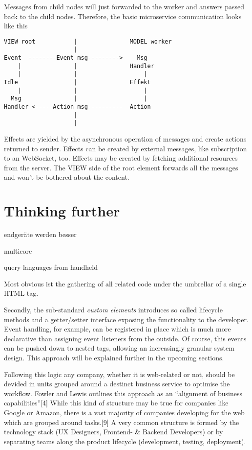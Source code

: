 \documentclass[]{article}
\begin{document}
Messages from child nodes will just forwarded to the worker and answers
passed back to the child nodes. Therefore, the basic microservice
communication looks like this

\begin{verbatim}
VIEW root           |               MODEL worker
                    |
Event  --------Event msg--------->    Msg
    |               |               Handler
    |               |                   |
Idle                |               Effekt
    |               |                   |
  Msg               |                   |
Handler <-----Action msg----------  Action                                      
                    |                   
                    |
\end{verbatim}

Effects are yielded by the asynchronous operation of messages and create
actions returned to sender. Effects can be created by external messages,
like subscription to an WebSocket, too. Effects may be created by
fetching additional resources from the server. The VIEW side of the root
element forwards all the messages and won't be bothered about the
content.

\section{Thinking further}\label{thinking-further}

endgeräte werden besser

multicore

query languages from handheld

Most obvious ist the gathering of all related code under the umbrellar
of a single HTML tag.

Secondly, the sub-standard \emph{custom elements} introduces so called
lifecycle methods and a getter/setter interface exposing the
functionality to the developer. Event handling, for example, can be
registered in place which is much more declarative than assigning event
listeners from the outside. Of course, this events can be pushed down to
nested tags, allowing an increasingly granular system design. This
approach will be explained further in the upcoming sections.

Following this logic any company, whether it is web-related or not,
should be devided in units grouped around a destinct business service to
optimise the workflow. Fowler and Lewis outlines this approach as an
``alignment of business capabilities''{[}4{]} While this kind of
structure may be true for companies like Google or Amazon, there is a
vast majority of companies developing for the web which are grouped
around tasks.{[}9{]} A very common structure is formed by the technology
stack (UX Designers, Frontend- \& Backend Developers) or by separating
teams along the product lifecycle (development, testing, deployment).
\end{document}
